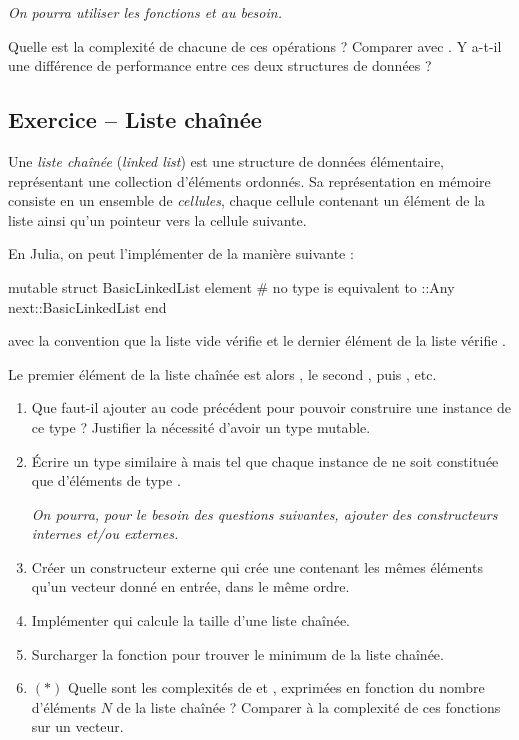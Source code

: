 \documentclass{article}
\newcounter{loop}
\newcounter{numEx}
\newcommand{\exo}[1]{
	\stepcounter{numEx}
	\setcounter{loop}{0}
	\subsection*{Exercice \arabic{numEx} -- #1}
}
\newenvironment{repl}{\vspace{-0.6em}\VerbatimEnvironment\begin{jlrepl}}{\end{jlrepl}}
\begin{document}
\textsl{On pourra utiliser les fonctions  et  au besoin.}

Quelle est la complexité de chacune de ces opérations ? Comparer avec . Y a-t-il une différence de performance entre ces deux structures de données ?

\exo{Liste chaînée}

Une \emph{liste chaînée} (\textit{linked list}) est une structure de données élémentaire, représentant une collection d'éléments ordonnés. Sa représentation en mémoire consiste en un ensemble de \emph{cellules}, chaque cellule contenant un élément de la liste ainsi qu'un pointeur vers la cellule suivante.

En Julia, on peut l'implémenter de la manière suivante :
\begin{repl}
	mutable struct BasicLinkedList
		element  # no type is equivalent to ::Any
		next::BasicLinkedList
	end
\end{repl}
avec la convention que la liste vide  vérifie  et le dernier élément  de la liste vérifie .

Le premier élément de la liste chaînée  est alors , le second , puis , etc.

\begin{enumerate}
	\item Que faut-il ajouter au code précédent pour pouvoir construire une instance de ce type ? Justifier la nécessité d'avoir un type mutable.

	\item Écrire un type  similaire à  mais tel que chaque instance de  ne soit constituée que d'éléments de type .
	
	\textsl{On pourra, pour le besoin des questions suivantes, ajouter des constructeurs internes et/ou externes.}

	\item Créer un constructeur externe  qui crée une  contenant les mêmes éléments qu'un vecteur  donné en entrée, dans le même ordre.

	\item Implémenter  qui calcule la taille d'une liste chaînée.

	\item Surcharger la fonction  pour trouver le minimum de la liste chaînée.

	\item $(*)$ Quelle sont les complexités de  et , exprimées en fonction du nombre d'éléments $N$ de la liste chaînée ? Comparer à la complexité de ces fonctions sur un vecteur.
\end{enumerate}
\end{document}
